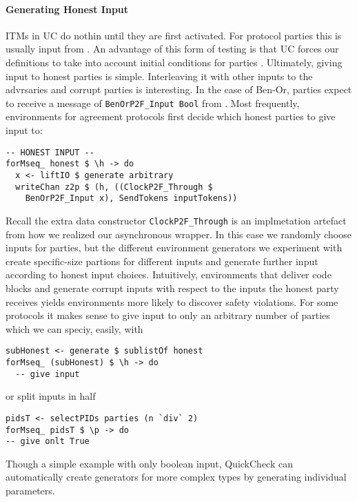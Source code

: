 \paragraph{Generating Honest Input}
ITMs in UC do nothin until they are first activated.
For protocol parties this is usually input from \Z.
An advantage of this form of testing is that UC forces our definitions to take into account initial conditions for parties .
Ultimately, giving input to honest parties is simple. Interleaving it with other inputs to the advrsaries and corrupt parties is interesting.
In the case of Ben-Or, parties expect to receive a message of \texttt{BenOrP2F\_Input Bool} from \Z.
Most frequently, environments for agreement protocols first decide which honest parties to give input to:
\begin{lstlisting}
-- HONEST INPUT --
forMseq_ honest $ \h -> do
  x <- liftIO $ generate arbitrary
  writeChan z2p $ (h, ((ClockP2F_Through $ 
    BenOrP2F_Input x), SendTokens inputTokens))
\end{lstlisting}
Recall the extra data constructor \texttt{ClockP2F\_Through} is an implmetation artefact from how we realized our asynchronous wrapper.
In this case we randomly choose inputs for parties, but the different environment generators we experiment with create specific-size partions for different inputs and generate further input according to honest input choices. 
Intuitively, environments that deliver code blocks and generate corrupt inputs with respect to the inputs the honest party receives yields environments more likely to discover safety violations.
For some protocols it makes sense to give input to only an arbitrary number of parties which we can speciy, easily, with 
\begin{lstlisting}
subHonest <- generate $ sublistOf honest
forMseq_ (subHonest) $ \h -> do  
  -- give input
\end{lstlisting}
or split inputs in half
\begin{lstlisting}
pidsT <- selectPIDs parties (n `div` 2)
forMseq_ pidsT $ \p -> do
-- give onlt True
\end{lstlisting}
Though a simple example with only boolean input, QuickCheck can automatically create generators for more complex types by generating individual parameters. 

